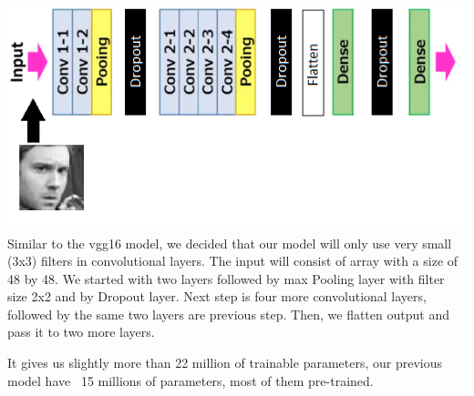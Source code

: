 \includegraphics[scale=1]{images/modelTwo/modelImg.png}
Similar to the vgg16 model, we decided that our model will only use very small (3x3) filters in convolutional layers. The input will consist of array with a size of 48 by 48. We started with two layers followed by max Pooling layer with filter size 2x2 and by Dropout layer. Next step is four more convolutional layers, followed by the same two layers are previous step. Then, we flatten output and pass it to two more layers.

It gives us slightly more than 22 million of trainable parameters, our previous model have ~15 millions of parameters, most of them pre-trained.